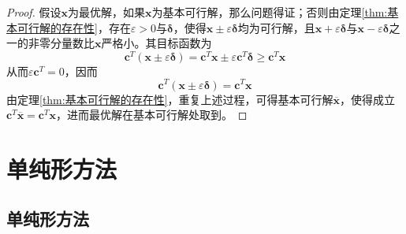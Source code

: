 \documentclass[lang = cn, scheme = chinese, thmcnt = section]{elegantbook}
\newcommand{\bs}{\boldsymbol}          %
\begin{document}
\begin{proof}
	假设$\bs{x}$为最优解，如果$\bs{x}$为基本可行解，那么问题得证；否则由定理\ref{thm:基本可行解的存在性}，存在$\varepsilon>0$与$\bs{\delta}$，使得$\bs{x}\pm\varepsilon\bs{\delta}$均为可行解，且$\bs{x}+\varepsilon\bs{\delta}$与$\bs{x}-\varepsilon\bs{\delta}$之一的非零分量数比$\bs{x}$严格小。其目标函数为
	$$
	\bs{c}^T(\bs{x}\pm\varepsilon\bs{\delta})
	=\bs{c}^T\bs{x}\pm \varepsilon\bs{c}^T\bs{\delta}
	\ge \bs{c}^T\bs{x}
	$$
	从而$\varepsilon\bs{c}^T=0$，因而
	$$
	\bs{c}^T(\bs{x}\pm\varepsilon\bs{\delta})
	=\bs{c}^T\bs{x}
	$$
	由定理\ref{thm:基本可行解的存在性}，重复上述过程，可得基本可行解$\overline{\bs{x}}$，使得成立$\bs{c}^T\overline{\bs{x}}=\bs{c}^T \bs{x}$，进而最优解在基本可行解处取到。
\end{proof}

\section{单纯形方法}

\subsection{单纯形方法}
\end{document}
